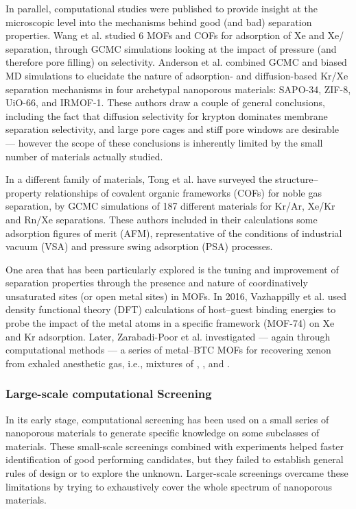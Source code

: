 \documentclass[main.tex]{subfiles}
\begin{document}
In parallel, computational studies were published to provide insight at the microscopic level into the mechanisms behind good (and bad) separation properties. Wang et al.\cite{Wang_2014} studied 6 MOFs and COFs for adsorption of Xe and Xe/ separation, through GCMC simulations looking at the impact of pressure (and therefore pore filling) on selectivity. Anderson et al.\cite{Anderson_2017} combined GCMC and biased MD simulations to elucidate the nature of adsorption- and diffusion-based Kr/Xe separation mechanisms in four archetypal nanoporous materials: SAPO-34, ZIF-8, UiO-66, and IRMOF-1. These authors draw a couple of general conclusions, including the fact that diffusion selectivity for krypton dominates membrane separation selectivity, and large pore cages and stiff pore windows are desirable --- however the scope of these conclusions is inherently limited by the small number of materials actually studied.

In a different family of materials, Tong et al.\cite{Tong_2017} have surveyed the structure--property relationships of covalent organic frameworks (COFs) for noble gas separation, by GCMC simulations of 187 different materials for Kr/Ar, Xe/Kr and Rn/Xe separations. These authors included in their calculations some adsorption figures of merit (AFM), representative of the conditions of industrial vacuum (VSA) and pressure swing adsorption (PSA) processes.

One area that has been particularly explored is the tuning and improvement of separation properties through the presence and nature of coordinatively unsaturated sites (or open metal sites) in MOFs. In 2016, Vazhappilly et al.\cite{Vazhappilly_2016} used density functional theory (DFT) calculations of host--guest binding energies to probe the impact of the metal atoms in a specific framework (MOF-74) on Xe and Kr adsorption. Later, Zarabadi-Poor et al.\cite{ZarabadiPoor_2018} investigated --- again through computational methods --- a series of metal--BTC MOFs for recovering xenon from exhaled anesthetic gas, i.e., mixtures of , , and .

\subsubsection{Large-scale computational Screening}

In its early stage, computational screening has been used on a small series of nanoporous materials to generate specific knowledge on some subclasses of materials. These small-scale screenings combined with experiments helped faster identification of good performing candidates, but they failed to establish general rules of design or to explore the unknown. Larger-scale screenings overcame these limitations by trying to exhaustively cover the whole spectrum of nanoporous materials.
\end{document}
